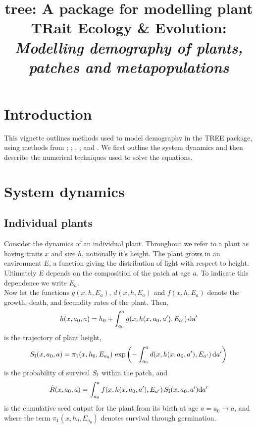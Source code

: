\documentclass[10pt,twoside]{article}
\title{tree: A package for modelling plant TRait Ecology \& Evolution:
\emph{Modelling demography of plants, patches and metapopulations}}
\date{}
\begin{document}
\maketitle


\section{Introduction}\label{introduction}
This vignette outlines methods used to model demography in the TREE
package, using methods from \citet{Deroos-1997}; \citet{Kohyama-1993};
\citet{Moorcroft-2001}, \citet{Falster-2011}; and \citet{Falster-2015}.
We first outline the system dynamics and then describe the numerical
techniques used to solve the equations.

\section{System dynamics}\label{system-dynamics}

\subsection{Individual plants}\label{individual-plants}

Consider the dynamics of an individual plant. Throughout we refer to a
plant as having traits \(x\) and size \(h\), notionally it's height. The
plant grows in an environment \(E\), a function giving the distribution
of light with respect to height. Ultimately \(E\) depends on the
composition of the patch at age \(a\). To indicate this dependence we
write \(E_a\).\\Now let the functions \(g(x,h,E_a)\), \(d(x,h,E_a)\) and
\(f(x,h,E_a)\) denote the growth, death, and fecundity rates of the
plant. Then,
\begin{equation} \label{eq:size}
  h(x, a_0, a) = h_0 + \int_{a_0}^{a} g(x, h(x, a_0, a^\prime),E_{a^\prime}) \, \rm{d}a^\prime
\end{equation}
is the trajectory of plant height,
\begin{equation} \label{eq:survivalIndividual}
  S_{\rm I} (x, a_0, a) = \pi_1 (x,h_0, E_{a_0}) \, \exp\left(- \int_{a_0}^{a} d(x,h(x, a_0, a^\prime), E_{a^\prime}) \, {\rm d} a^\prime \right)
\end{equation}
is the probability of survival \(S_{\rm I}\) within the patch, and
\begin{equation} \label{eq:tildeR1}
  \tilde{R}(x, a_0, a) =\int_{a_0}^{a} f(x, h(x, a_0, a^\prime), E_{a^\prime}) \, S_{\rm I} (x, a_0, a^\prime) {\rm d} a^\prime
\end{equation}
is the cumulative seed output for the plant from its birth at age
\(a=a_0 \rightarrow a\), and where the term \(\pi_1 (x,h_0, E_{a_0})\)
denotes survival through germination.
\end{document}
